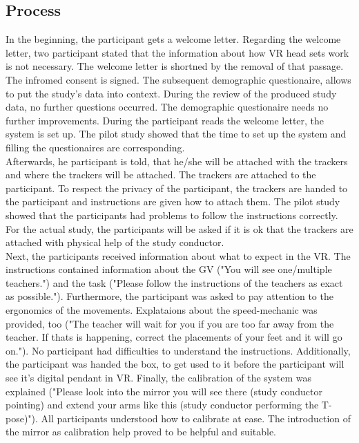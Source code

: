 \subsection{Process}
In the beginning, the participant gets a welcome letter. Regarding the welcome letter, two participant stated that the information about how VR head sets work is not necessary. The welcome letter is shortned by the removal of that passage. The infromed consent is signed. The subsequent demographic questionaire, allows to put the study's data into context. During the review of the produced study data, no further questions occurred. The demographic questionaire needs no further improvements. During the participant reads the welcome letter, the system is set up. The pilot study showed that the time to set up the system and filling the questionaires are corresponding.\\
Afterwards, he participant is told, that he/she will be attached with the trackers and where the trackers will be attached. The trackers are attached to the participant. To respect the privacy of the participant, the trackers are handed to the participant and instructions are given how to attach them. The pilot study showed that the participants had problems to follow the instructions correctly. For the actual study, the participants will be asked if it is ok that the trackers are attached with physical help of the study conductor.\\
Next, the participants received information about what to expect in the VR. The instructions contained information about the GV ("You will see one/multiple teachers.") and the task ("Please follow the instructions of the teachers as exact as possible."). Furthermore, the participant was asked to pay attention to the ergonomics of the movements. Explataions about the speed-mechanic was provided, too ("The teacher will wait for you if you are too far away from the teacher. If thats is happening, correct the placements of your feet and it will go on."). No participant had difficulties to understand the instructions. Additionally, the participant was handed the box, to get used to it before the participant will see it's digital pendant in VR. Finally, the calibration of the system was explained ("Please look into the mirror you will see there (study conductor pointing) and extend your arms like this (study conductor performing the T-pose)"). All participants understood how to calibrate at ease. The introduction of the mirror as calibration help proved to be helpful and suitable.\\
